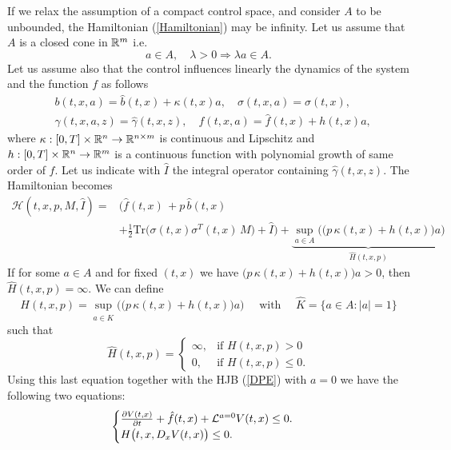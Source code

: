 If we relax the assumption of a compact control space, and consider $A$ to be unbounded, the Hamiltonian (\ref{Hamiltonian}) may be infinity. 
Let us assume that $A$ is a closed cone in $\mathbb{R}^m$ i.e. 
\begin{equation}\label{unbounded_set}
 a \in A, \quad \lambda > 0 \Longrightarrow \lambda a \in A.
\end{equation}
Let us assume also that the control influences linearly the dynamics of the system and the function $f$ as follows
\begin{align}\label{linear_control}
 & b(t,x,a) = \hat b(t,x) + \kappa(t,x) a, \quad \sigma(t,x,a) = \hat \sigma(t,x), \\ \nonumber
 & \gamma(t,x,a,z) = \hat \gamma(t,x,z), \quad f(t,x,a) = \hat f(t,x) + h(t,x) a, 
\end{align}
where $\kappa : [0,T] \times \mathbb{R}^n \to \mathbb{R}^{n \times m}$ is continuous and Lipschitz and $h: [0,T] \times \mathbb{R}^n \to \mathbb{R}^{m}$ is a continuous function with polynomial growth of same order
of $f$.
Let us indicate with $\hat I$ the integral operator containing $\hat \gamma(t,x,z)$.
The Hamiltonian becomes
\begin{align*}
 \mathcal{H}(t,x,p,M,\hat I) =& \biggl( \hat f(t,x) \, + p \, \hat b(t,x) \\ \nonumber
              &+ \frac{1}{2} \mbox{Tr} \bigl( \sigma(t,x)\sigma^T(t,x) \, M \bigr) +\hat I \biggr) + 
              \underbrace{\sup_{a \in A} \biggl( \bigl( p \, \kappa(t,x) + h(t,x) \bigr) a \biggr) }_{\hat H(t,x,p)} 
\end{align*}
If for some $a\in A$ and for fixed $(t,x)$ we have $\bigl( p \, \kappa(t,x) + h(t,x) \bigr) a>0$, then $\hat H(t,x,p) = \infty$. We can define 
\begin{equation}\label{set_K}
 H(t,x,p) = \sup_{a \in \hat K} \biggl( \bigl( p \, \kappa(t,x) + h(t,x) \bigr) a \biggr) \quad \mbox{ with } \quad \hat K = \{ a \in A: |a|=1 \}
\end{equation}
such that
\begin{equation}
\hat H(t,x,p) = \begin{cases} 
 \infty, & \mbox{if } H(t,x,p) >0 \\ 
  0,     & \mbox{if } H(t,x,p) \leq 0 . 
\end{cases} 
\end{equation}
Using this last equation together with the HJB (\ref{DPE}) with $a=0$ we have the following two equations:
\begin{equation}
\begin{cases}
 \frac{\partial V(t,x)}{\partial t} + \hat f(t,x) + \mathcal{L}^{a=0}V(t,x)  \leq 0. \\
 H\bigl(t,x, D_x V(t,x) \bigr) \leq 0.
\end{cases}
\end{equation}
